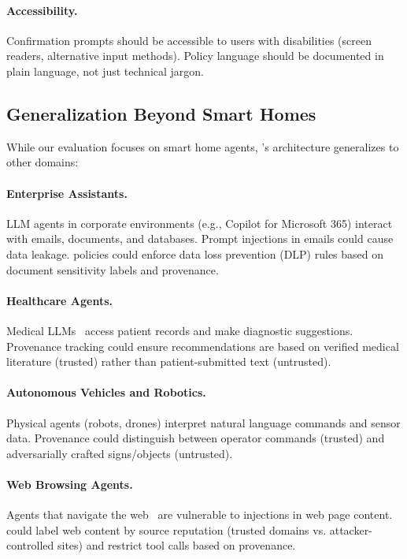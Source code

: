 \paragraph{Accessibility.}
Confirmation prompts should be accessible to users with disabilities (screen readers, alternative input methods).
Policy language should be documented in plain language, not just technical jargon.

\subsection{Generalization Beyond Smart Homes}

While our evaluation focuses on smart home agents, \sys{}'s architecture generalizes to other domains:

\paragraph{Enterprise Assistants.}
LLM agents in corporate environments (e.g., Copilot for Microsoft 365) interact with emails, documents,
and databases. Prompt injections in emails could cause data leakage. \sys{} policies could enforce
data loss prevention (DLP) rules based on document sensitivity labels and provenance.

\paragraph{Healthcare Agents.}
Medical LLMs~\cite{medical-llm} access patient records and make diagnostic suggestions. Provenance tracking
could ensure recommendations are based on verified medical literature (trusted) rather than patient-submitted
text (untrusted).

\paragraph{Autonomous Vehicles and Robotics.}
Physical agents (robots, drones) interpret natural language commands and sensor data. Provenance could
distinguish between operator commands (trusted) and adversarially crafted signs/objects (untrusted).

\paragraph{Web Browsing Agents.}
Agents that navigate the web~\cite{webgpt,webgptplus} are vulnerable to injections in web page content.
\sys{} could label web content by source reputation (trusted domains vs. attacker-controlled sites) and
restrict tool calls based on provenance.

